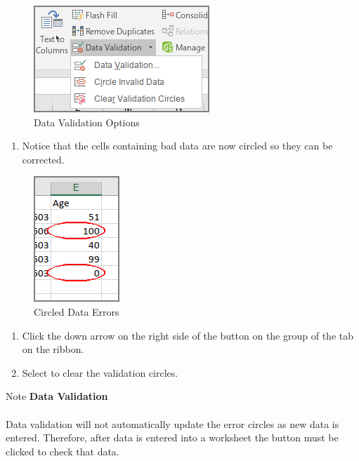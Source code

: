 \begin{figure}[H]
	\centering
	\includegraphics[width=\maxwidth{.95\linewidth}]{gfx/ch07_fig42}
	\caption{Data Validation Options}
	\label{07:fig42}
\end{figure}

\begin{enumerate}[resume]	
	\item Notice that the cells containing bad data are now circled so they can be corrected.
\end{enumerate}

\begin{figure}[H]
	\centering
	\includegraphics[width=\maxwidth{.95\linewidth}]{gfx/ch07_fig43}
	\caption{Circled Data Errors}
	\label{07:fig43}
\end{figure}

\begin{enumerate}[resume]	
	\item Click the down arrow on the right side of the  button on the  group of the  tab on the ribbon. 
	\item Select  to clear the validation circles.
\end{enumerate}

\begin{center}
	\begin{infobox}{Note}
		\textbf{Data Validation}
		\\
		\\
		Data validation will not automatically update the error circles as new data is entered. Therefore, after data is entered into a worksheet the  button must be clicked to check that data.
	\end{infobox}
\end{center}

